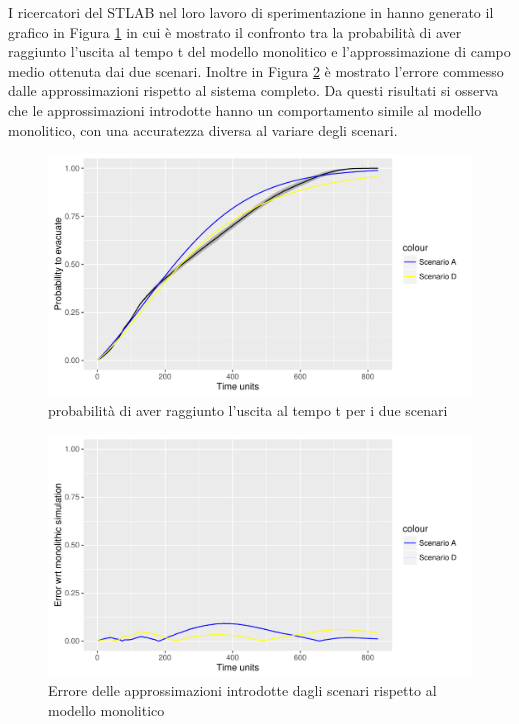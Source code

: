 I ricercatori del STLAB nel loro lavoro di sperimentazione in \cite{esperimenti-sandro} hanno generato il grafico in Figura \ref{fig:scenariosAD} in cui è mostrato il confronto tra la probabilità di aver raggiunto l'uscita al tempo t del modello monolitico e l'approssimazione di campo medio ottenuta dai due scenari. Inoltre in Figura \ref{fig:errorsplotAD} è mostrato l'errore commesso dalle approssimazioni rispetto al sistema completo. Da questi risultati si osserva che le approssimazioni introdotte hanno un comportamento simile al modello monolitico, con una accuratezza diversa al variare degli scenari.

\begin{figure}[htbp]
\centering
\includegraphics[width=\textwidth,height=\textheight,keepaspectratio]{images/scenariosAD.pdf}
\caption{probabilità di aver raggiunto l'uscita al tempo t per i due scenari}
\label{fig:scenariosAD}
\end{figure}

\begin{figure}[htbp]
\centering
\includegraphics[width=\textwidth,height=\textheight,keepaspectratio]{images/errorplotAD.pdf}
\caption{Errore delle approssimazioni introdotte dagli scenari rispetto al modello monolitico}
\label{fig:errorsplotAD}
\end{figure}

 